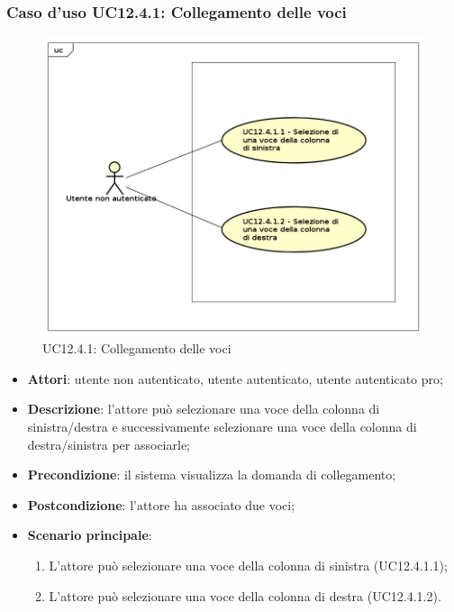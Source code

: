 \subsubsection{Caso d'uso UC12.4.1: Collegamento delle voci}
\label{UC12.4.1}
\begin{figure}[h]
	\centering
	\includegraphics[scale=0.5]{UML/UC12_4_1.png}
	\caption{UC12.4.1: Collegamento delle voci}
\end{figure}
\begin{itemize}
\item \textbf{Attori}: utente non autenticato, utente autenticato, utente autenticato pro;
\item \textbf{Descrizione}: l'attore può selezionare una voce della colonna di sinistra/destra e successivamente selezionare una voce della colonna di destra/sinistra per associarle;
\item \textbf{Precondizione}: il sistema visualizza la domanda di collegamento;
\item \textbf{Postcondizione}: l'attore ha associato due voci;
\item \textbf{Scenario principale}:
\begin{enumerate}
\item L'attore può selezionare una voce della colonna di sinistra (UC12.4.1.1);
\item L'attore può selezionare una voce della colonna di destra (UC12.4.1.2).
\end{enumerate}
\end{itemize}


